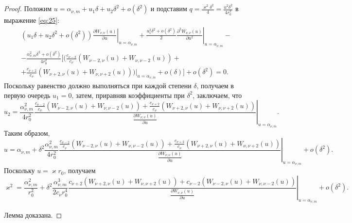 \begin{proof}
Положим $u = \alpha_{\nu, m} + u_1 \delta + u_2 \delta^2 + o(\delta^2)$ и подставим $q = \frac{\varkappa^2 \delta^2}{4} = \frac{u^2 \delta^2}{4 r_0^2}$ в выражение \eqref{eq:25}:
\begin{multline*}
    (u_1 \delta + u_2 \delta^2 + o(\delta^2)) 
\left.
\frac{\partial W_{\nu, \nu}(u)}{\partial u}
\right|_{u=\alpha_{\nu, m}} + 
    \frac{u_1^2 \delta^2 + o(\delta^2)}{2}
\left.
\frac{\partial^2 W_{\nu, \nu}(u)}{\partial u^2}
\right|_{u=\alpha_{\nu, m}} 
- \\ - \frac{\alpha_{\nu, m}^2 \delta^2 + o(\delta^2)}{4r_0^2}  \bigg[\bigg(    
	\frac{c_{\nu-2}}{c_\nu}
    \left(W_{\nu-2, \nu}(u) + W_{\nu, \nu-2}(u) \right)+ 
\\
+	\frac{c_{\nu+2}}{c_\nu}
	\left(
	W_{\nu+2, \nu}(u) + W_{\nu, \nu+2}(u)
	\right)
\left.
\bigg)
\right|_{u=\alpha_{\nu, m}}
+ o(\delta)
\bigg]
 + o(\delta^2) = 0.
 \end{multline*}
Поскольку равенство должно выполняться при каждой степени $\delta$, получаем в первую очередь $u_1 = 0$, затем, приравняв коэффициенты при $\delta^2$, заключаем, что
$$u_2 = \frac{\alpha_{\nu, m}^2}{4r_0^2} 
\left.
\frac{
	\frac{c_{\nu-2}}{c_\nu}
	\left(
	W_{\nu-2, \nu}(u) + W_{\nu, \nu-2}(u)
	\right)+
	\frac{c_{\nu+2}}{c_\nu}
	\left(
	W_{\nu+2, \nu}(u) + W_{\nu, \nu+2}(u)
	\right)
}{ \frac{\partial W_{\nu,\nu}(u)}{\partial u} }
\right|_{u=\alpha_{\nu, m}}.$$
Таким образом, 
{\small
\[
u = \alpha_{\nu, m} + \delta^2 \frac{\alpha_{\nu, m}^2}{4r_0^2} \left.
\frac{
	\frac{c_{\nu-2}}{c_\nu}
	\left(
	W_{\nu-2, \nu}(u) + W_{\nu, \nu-2}(u)
	\right)+
	\frac{c_{\nu+2}}{c_\nu}
	\left(
	W_{\nu+2, \nu}(u) + W_{\nu, \nu+2}(u)
	\right)
}{ \frac{\partial W_{\nu,\nu}(u)}{\partial u} }
\right|_{u=\alpha_{\nu, m}} + o(\delta^2). 
\]
}
Поскольку $u = \varkappa r_0$, получаем
{\small
\[
\varkappa^2 = \dfrac{\alpha_{\nu, m}^2}{r_0^2} + \delta^2 \dfrac{\alpha_{\nu, m}^3}{2 c_\nu r_0^4} \left. \frac{
c_{\nu+2} \left( W_{\nu+2, \nu}(u) + W_{\nu, \nu+2}(u) \right) + 
c_{\nu-2} \left( W_{\nu-2, \nu}(u) + W_{\nu, \nu-2}(u) \right)
}{ \frac{\partial W_{\nu,\nu}(u)}{\partial u} }\right|_{u=\alpha_{\nu, m}} + o(\delta^2).
\]
}

Лемма доказана.
\end{proof}
\medskip

